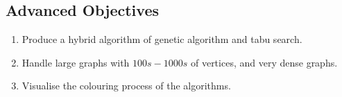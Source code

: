 \documentclass[12pt,a4paper]{article}
\begin{document}
\subsection*{Advanced Objectives}
\begin{enumerate}[label = \textbf{A\arabic*}]
\itemsep0em
\item Produce a hybrid algorithm of genetic algorithm and tabu search. \label{obj:A3}
\item Handle large graphs with $100s - 1000s$ of vertices, and very dense graphs. \label{obj:A2}
\item Visualise the colouring process of the algorithms. \label{obj:A1}


\end{enumerate}
\end{document}
